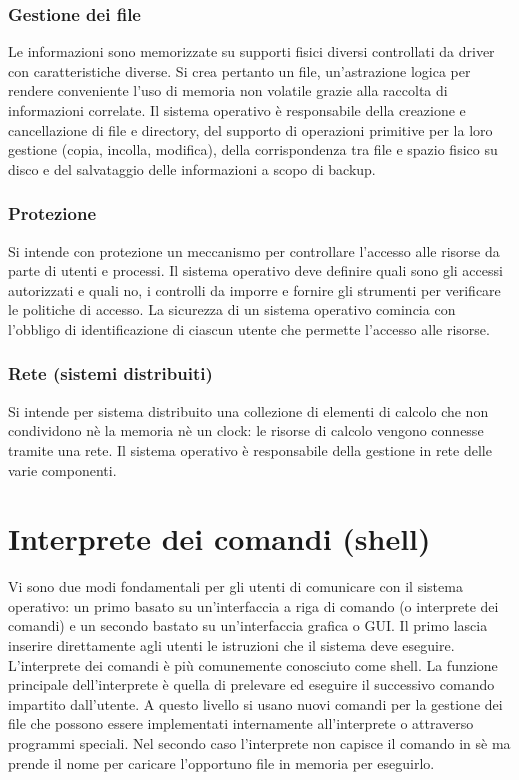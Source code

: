 \subsubsection{Gestione dei file}
Le informazioni sono memorizzate su supporti fisici diversi controllati da driver con caratteristiche diverse. Si crea pertanto un file, un'astrazione logica per rendere conveniente l'uso di memoria non volatile 
grazie alla raccolta di informazioni correlate. Il sistema operativo \`e responsabile della creazione e cancellazione di file e directory, del supporto di operazioni primitive per la loro gestione (copia, incolla, modifica), 
della corrispondenza tra file e spazio fisico su disco e del salvataggio delle informazioni a scopo di backup. 
\subsubsection{Protezione}
Si intende con protezione un meccanismo per controllare l'accesso alle risorse da parte di utenti e processi. Il sistema operativo deve definire quali sono gli accessi autorizzati e quali no, i controlli da imporre e fornire gli 
strumenti per verificare le politiche di accesso. La sicurezza di un sistema operativo comincia con l'obbligo di identificazione di ciascun utente che permette l'accesso alle risorse.  
\subsubsection{Rete (sistemi distribuiti)}
Si intende per sistema distribuito una collezione di elementi di calcolo che non condividono n\`e la memoria n\`e un clock: le risorse di calcolo vengono connesse tramite una rete. Il sistema operativo \`e 
responsabile della gestione in rete delle varie componenti.
\section{Interprete dei comandi (shell)}
Vi sono due modi fondamentali per gli utenti di comunicare con il sistema operativo: un primo basato su un'interfaccia a riga di comando (o interprete dei comandi) e un secondo bastato su un'interfaccia grafica o GUI. Il primo lascia
inserire direttamente agli utenti le istruzioni che il sistema deve eseguire. L'interprete dei comandi \`e pi\`u comunemente conosciuto come shell. La funzione principale dell'interprete \`e quella di prelevare ed eseguire il successivo
comando impartito dall'utente. A questo livello si usano nuovi comandi per la gestione dei file che possono essere implementati internamente all'interprete o attraverso programmi speciali. Nel secondo caso l'interprete non capisce il
comando in s\`e ma prende il nome per caricare l'opportuno file in memoria per eseguirlo.

